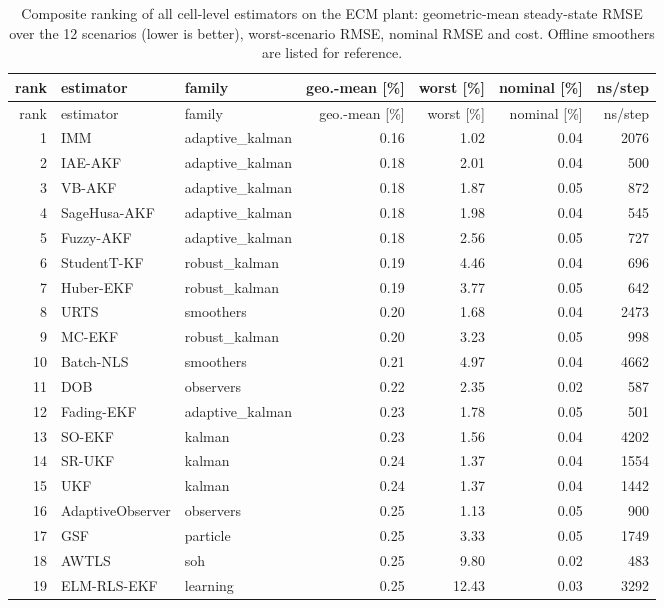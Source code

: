 \begingroup\footnotesize\setlength{\tabcolsep}{4pt}
\begin{longtable}{rllrrrr}
\caption{Composite ranking of all cell-level estimators on the ECM plant: geometric-mean steady-state RMSE over the 12 scenarios (lower is better), worst-scenario RMSE, nominal RMSE and cost. Offline smoothers are listed for reference.}\label{tab:ranking}\\
\toprule rank & estimator & family & geo.-mean [\%] & worst [\%] & nominal [\%] & ns/step \\ \midrule\endfirsthead
\toprule rank & estimator & family & geo.-mean [\%] & worst [\%] & nominal [\%] & ns/step \\ \midrule\endhead
1 & IMM & adaptive\_kalman & 0.16 & 1.02 & 0.04 & 2076 \\
2 & IAE-AKF & adaptive\_kalman & 0.18 & 2.01 & 0.04 & 500 \\
3 & VB-AKF & adaptive\_kalman & 0.18 & 1.87 & 0.05 & 872 \\
4 & SageHusa-AKF & adaptive\_kalman & 0.18 & 1.98 & 0.04 & 545 \\
5 & Fuzzy-AKF & adaptive\_kalman & 0.18 & 2.56 & 0.05 & 727 \\
6 & StudentT-KF & robust\_kalman & 0.19 & 4.46 & 0.04 & 696 \\
7 & Huber-EKF & robust\_kalman & 0.19 & 3.77 & 0.05 & 642 \\
8 & URTS & smoothers & 0.20 & 1.68 & 0.04 & 2473 \\
9 & MC-EKF & robust\_kalman & 0.20 & 3.23 & 0.05 & 998 \\
10 & Batch-NLS & smoothers & 0.21 & 4.97 & 0.04 & 4662 \\
11 & DOB & observers & 0.22 & 2.35 & 0.02 & 587 \\
12 & Fading-EKF & adaptive\_kalman & 0.23 & 1.78 & 0.05 & 501 \\
13 & SO-EKF & kalman & 0.23 & 1.56 & 0.04 & 4202 \\
14 & SR-UKF & kalman & 0.24 & 1.37 & 0.04 & 1554 \\
15 & UKF & kalman & 0.24 & 1.37 & 0.04 & 1442 \\
16 & AdaptiveObserver & observers & 0.25 & 1.13 & 0.05 & 900 \\
17 & GSF & particle & 0.25 & 3.33 & 0.05 & 1749 \\
18 & AWTLS & soh & 0.25 & 9.80 & 0.02 & 483 \\
19 & ELM-RLS-EKF & learning & 0.25 & 12.43 & 0.03 & 3292 \\

\end{longtable}

